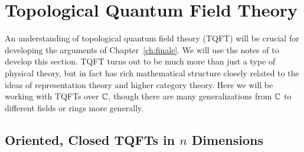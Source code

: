 	
	
	\section{Topological Quantum Field Theory} %
	\label{sec:topological_quantum_field_theory}
	
	An understanding of topological quantum field theory (TQFT) will be crucial for developing the arguments of Chapter~\ref{ch:finale}. We will use the notes of \cite{carqueville2017} to develop this section. TQFT turns out to be much more than just a type of physical theory, but in fact has rich mathematical structure closely related to the ideas of representation theory and higher category theory. Here we will be working with TQFTs over $\mathbb{C}$, though there are many generalizations from $\mathbb{C}$ to different fields or rings more generally.
	
	\subsection{Oriented, Closed TQFTs in $n$ Dimensions} %
	\label{sub:oriented_closed_tqfts_in_n_dimensions}
	

